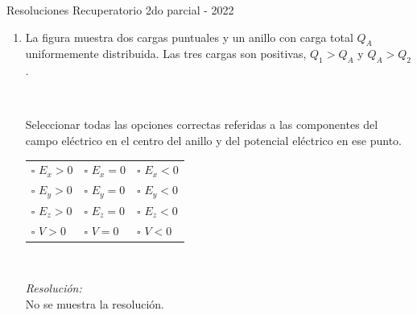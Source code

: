 \documentclass[a4paper,11pt,dvipsnames]{article}
\begin{document}
{\Large Resoluciones Recuperatorio 2do parcial - 2022}

\begin{enumerate}[leftmargin=*]

\item
\begin{minipage}[t]{.4\textwidth}
La figura muestra dos cargas puntuales y un anillo con carga total $Q_A$ uniformemente distribuida. Las tres cargas son positivas, $Q_1>Q_A$ y $Q_A>Q_2$.
\begin{center}
\end{center}
\end{minipage}
\begin{minipage}[t]{.05\textwidth}
~    
\end{minipage}
\begin{minipage}[t]{.5\textwidth}
Seleccionar todas las opciones correctas referidas a las componentes del campo eléctrico en el centro del anillo y del potencial eléctrico en ese punto.\\
\begin{tabularx}{\textwidth}{XXX}
$\square$ $E_x > 0$ & $\square$ $E_x = 0$ & $\square$ $E_x < 0$ \\
$\square$ $E_y > 0$ & $\square$ $E_y = 0$ & $\square$ $E_y < 0$\\
$\square$ $E_z > 0$ & $\square$ $E_z = 0$ & $\square$ $E_z < 0$\\
$\square$ $V > 0$ & $\square$ $V = 0$ & $\square$ $V < 0$
\end{tabularx}
\end{minipage}

\

\textit{Resolución:}\\
No se muestra la resolución.



\end{enumerate}
\end{document}
